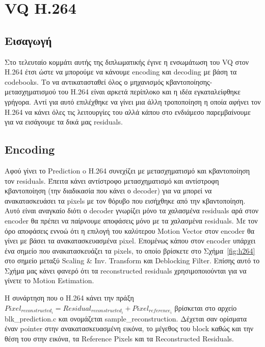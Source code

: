 ﻿\chapter{VQ H.264}
\label{chapter:chap5}

\section{Εισαγωγή}
\label{section:sect51}

\indent Στο τελευταίο κομμάτι αυτής της διπλωματικής έγινε η ενσωμάτωση του VQ στον H.264 έτσι ώστε να μπορούμε να κάνουμε encoding και decoding με βάση τα codebooks. Το να αντικατασταθεί όλος ο μηχανισμός κβαντοποίησης-μετασχηματισμού του H.264 είναι αρκετά περίπλοκο και η ιδέα εγκαταλείφθηκε γρήγορα. Αντί για αυτό επιλέχθηκε να γίνει μια άλλη τροποποίηση η οποία αφήνει τον H.264 να κάνει όλες τις λειτουργίες του αλλά κάπου στο ενδιάμεσο παρεμβαίνουμε για να εισάγουμε τα δικά μας residuals.

\section{Encoding}
\label{section:sect52}

\indent Αφού γίνει το Prediction o H.264 συνεχίζει με μετασχηματισμό και κβαντοποίηση τον residuals. Έπειτα κάνει αντίστροφο μετασχηματισμό και αντίστροφη κβαντοποίηση (την διαδικασία που κάνει ο decoder) για να μπορεί να ανακατασκευάσει τα pixels με τον θόρυβο που εισήχθηκε από την κβαντοποίηση. Αυτό είναι αναγκαίο διότι ο decoder γνωρίζει μόνο τα χαλασμένα residuals αρά στον encoder θα πρέπει να παίρνουμε αποφάσεις μόνο με τα χαλασμένα residuals. Με τον όρο αποφάσεις εννοώ ότι η επιλογή του καλύτερου Motion Vector στον encoder θα γίνει με βάσει τα ανακατασκευασμένα pixel. Επομένως κάπου στον encoder υπάρχει ένα σημείο που ανακατασκευάζει τα pixels, το οποίο βρίσκετε στο Σχήμα~\ref{fig:h264} στο σημείο μεταξύ Scaling \& Inv. Transform και Deblocking Filter. Επίσης αυτό το Σχήμα μας κάνει φανερό ότι τα reconstructed residuals χρησιμοποιούνται για να γίνετε το Motion Estimation.

\indent Η συνάρτηση που ο Η.264 κάνει την πράξη $ Pixel_{reconstructed_i} = Residual_{reconstructed_i} + Pixel_{reference_i} $ βρίσκεται στο αρχείο blk\_prediction.c και ονομάζεται sample\_reconstruction. Δέχεται σαν ορίσματα έναν pointer στην ανακατασκευασμένη εικόνα, το μέγεθος του block καθώς και την θέση του στην εικόνα, τα Reference Pixels και τα Reconstructed Residuals.

